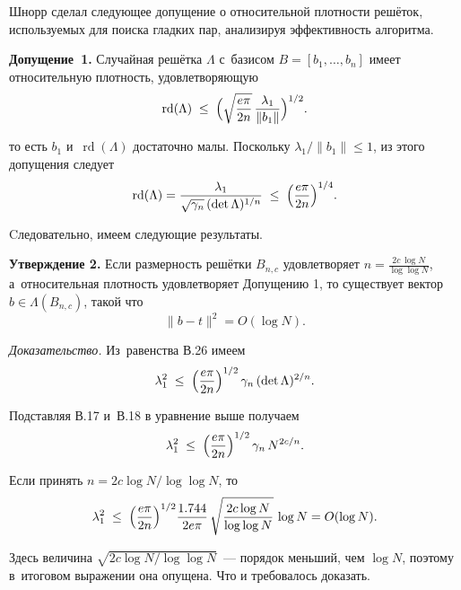 Шнорр сделал следующее допущение о относительной плотности решёток,
используемых для поиска гладких пар, анализируя эффективность алгоритма.

\textbf{Допущение 1.}
Случайная решётка $\Lambda$ с базисом
$B=[b_{1},\dots,b_{n}]$ имеет относительную плотность, удовлетворяющую
\begin{equation}
\operatorname{rd}(\Lambda)
\;\le\;
\Bigl(
  \sqrt{\frac{e\pi}{2n}}\,
  \frac{\lambda_{1}}{\lVert b_{1}\rVert}
\Bigr)^{1/2}.
\end{equation}

то есть $b_{1}$ и $\operatorname{rd}(\Lambda)$ достаточно малы. Поскольку
$\lambda_{1}/\lVert b_{1}\rVert\le 1$, из этого допущения следует
\begin{equation}
\operatorname{rd}(\Lambda)
  = \frac{\lambda_{1}}
         {\sqrt{\gamma_{n}}\,
          (\det\Lambda)^{1/n}}
  \;\le\;
  \Bigl(\frac{e\pi}{2n}\Bigr)^{1/4}.
\end{equation}

Cледовательно, имеем следующие результаты.

\textbf{Утверждение 2.} Если размерность решётки $B_{n,c}$ удовлетворяет $n =
\frac{2c\,\log N}{\log\log N}$, а относительная плотность удовлетворяет
Допущению 1, то существует вектор $b\in\Lambda(B_{n,c})$, такой что
\begin{equation}
 \lVert b - t\rVert^{2} = O(\log N).
\end{equation}

\textit{Доказательство.}
Из равенства В.26 имеем
\begin{equation}
  \lambda_{1}^{2}
  \;\le\;
  \Bigl(\frac{e\pi}{2n}\Bigr)^{1/2}\,
  \gamma_{n}\,(\det\Lambda)^{2/n}.
\end{equation}

Подставляя В.17 и В.18 в уравнение выше получаем
\begin{equation}
  \lambda_{1}^{2}
  \;\le\;
  \Bigl(\frac{e\pi}{2n}\Bigr)^{1/2}\,
  \gamma_{n}\,N^{2c/n}.
\end{equation}

Если принять $n = 2c\log N/\log\log N$, то
\begin{equation}
  \lambda_{1}^{2}
  \;\le\;
  \Bigl(\frac{e\pi}{2n}\Bigr)^{1/2}
  \frac{1.744}{2e\pi}\,
  \sqrt{\frac{2c\log N}{\log\log N}}\,
  \log N = O(\log N).
\end{equation}

Здесь величина $\sqrt{2c\log N/\log\log N}$ — порядок меньший, чем $\log N$,
поэтому в итоговом выражении она опущена. Что и требовалось доказать.

